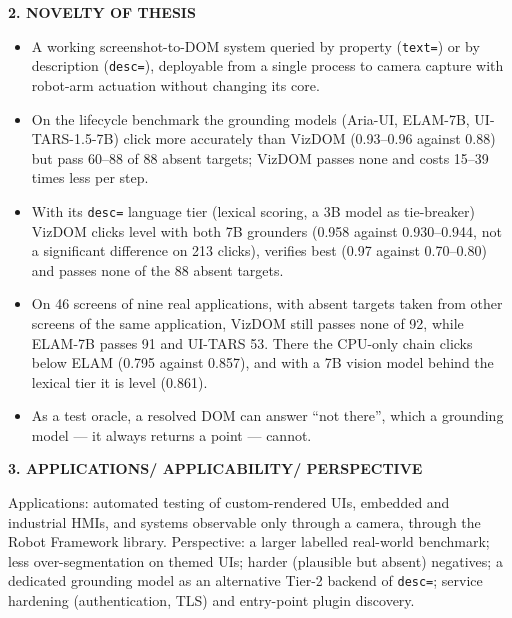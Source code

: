 \documentclass[11pt,a4paper]{article}
\newcommand{\code}[1]{\texttt{#1}}
\begin{document}
\textbf{2. NOVELTY OF THESIS}
\begin{itemize}[leftmargin=1.4em, itemsep=0.2em]
  \item A working screenshot-to-DOM system queried by property (\code{text=}) or by
        description (\code{desc=}), deployable from a single process to camera
        capture with robot-arm actuation without changing its core.
  \item On the lifecycle benchmark the grounding models (Aria-UI, ELAM-7B,
        UI-TARS-1.5-7B) click more accurately than VizDOM (0.93--0.96 against 0.88)
        but pass 60--88 of 88 absent targets; VizDOM passes none and costs 15--39
        times less per step.
  \item With its \code{desc=} language tier (lexical scoring, a 3B model as
        tie-breaker) VizDOM clicks level with both 7B grounders (0.958 against
        0.930--0.944, not a significant difference on 213 clicks), verifies best
        (0.97 against 0.70--0.80) and passes none of the 88 absent targets.
  \item On 46 screens of nine real applications, with absent targets taken from
        other screens of the same application, VizDOM still passes none of 92,
        while ELAM-7B passes 91 and UI-TARS 53. There the CPU-only chain clicks
        below ELAM (0.795 against 0.857), and with a 7B vision model behind the
        lexical tier it is level (0.861).
  \item As a test oracle, a resolved DOM can answer ``not there'', which a grounding
        model --- it always returns a point --- cannot.
\end{itemize}

\textbf{3. APPLICATIONS/ APPLICABILITY/ PERSPECTIVE}

Applications: automated testing of custom-rendered UIs, embedded and industrial
HMIs, and systems observable only through a camera, through the Robot Framework
library. Perspective: a larger labelled real-world benchmark; less
over-segmentation on themed UIs; harder (plausible but absent) negatives; a
dedicated grounding model as an alternative Tier-2 backend of \code{desc=};
service hardening (authentication, TLS) and entry-point plugin discovery.
\newpage
\end{document}
